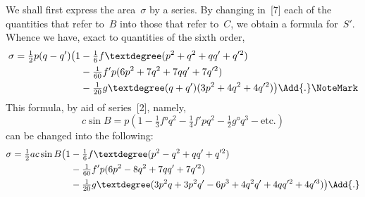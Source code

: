 We shall first express the area~$\sigma$ by a series. By changing in~[7] each of the
quantities that refer to~$B$ into those that refer to~$C$, we obtain a formula for~$S'$.
Whence we have, exact to quantities of the sixth order,
\begin{align*}
\sigma = \tfrac{1}{2}p(q - q')
  \bigl(1 &- \tfrac{1}{6} f°(p^{2} + q^{2} + qq' + q'^{2}) \\
          &- \tfrac{1}{60}f'p(6p^{2} + 7q^{2} + 7qq' + 7q'^{2}) \\
          &- \tfrac{1}{20}g°(q + q')(3p^{2} + 4q^{2} + 4q'^{2})\bigr)\Add{.}\NoteMark
\end{align*}
This formula, by aid of series~[2], namely,
\[
c\sin B = p(1 - \tfrac{1}{3}f°q^{2}
              - \tfrac{1}{4}f'pq^{2}
              - \tfrac{1}{2}g°q^{3} - \text{etc.})
\]
can be changed into the following:
\begin{align*}
\sigma = \tfrac{1}{2}ac\sin B
  \bigl(1 &- \tfrac{1}{6} f°(p^{2} - q^{2} + qq' + q'^{2}) \\
          &- \tfrac{1}{60}f'p(6p^{2} - 8q^{2} + 7qq' + 7q'^{2}) \\
          &- \tfrac{1}{20}g°
    (3p^{2}q + 3p^{2}q' - 6p^{3} + 4q^{2}q' + 4qq'^{2} + 4q'^{3})\bigr)\Add{.}
\end{align*}

